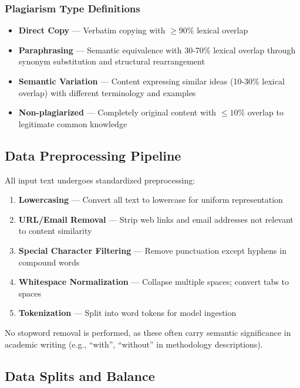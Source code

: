 \subsubsection{Plagiarism Type Definitions}

\begin{itemize}
  \item \textbf{Direct Copy} --- Verbatim copying with $\geq 90\%$ lexical overlap
  \item \textbf{Paraphrasing} --- Semantic equivalence with 30-70\% lexical overlap through synonym substitution and structural rearrangement
  \item \textbf{Semantic Variation} --- Content expressing similar ideas (10-30\% lexical overlap) with different terminology and examples
  \item \textbf{Non-plagiarized} --- Completely original content with $\leq 10\%$ overlap to legitimate common knowledge
\end{itemize}

\subsection{Data Preprocessing Pipeline}

All input text undergoes standardized preprocessing:

\begin{enumerate}
  \item \textbf{Lowercasing} --- Convert all text to lowercase for uniform representation
  
  \item \textbf{URL/Email Removal} --- Strip web links and email addresses not relevant to content similarity
  
  \item \textbf{Special Character Filtering} --- Remove punctuation except hyphens in compound words
  
  \item \textbf{Whitespace Normalization} --- Collapse multiple spaces; convert tabs to spaces
  
  \item \textbf{Tokenization} --- Split into word tokens for model ingestion
\end{enumerate}

No stopword removal is performed, as these often carry semantic significance in academic writing (e.g., ``with'', ``without'' in methodology descriptions).

\subsection{Data Splits and Balance}

